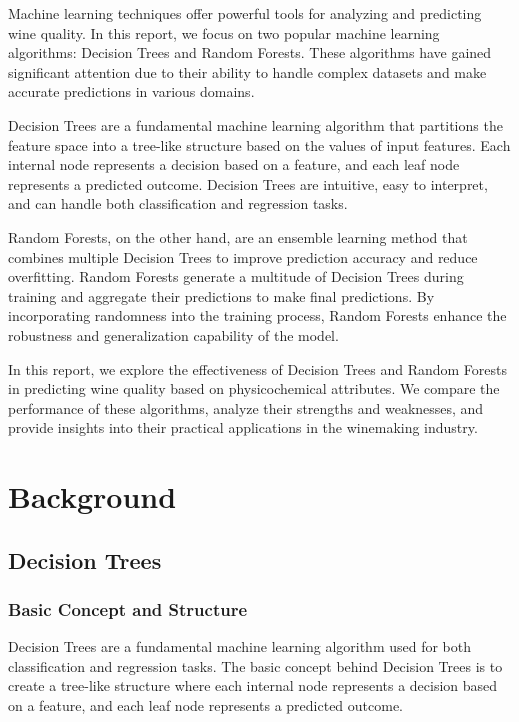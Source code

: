 \documentclass{ufazreport}
\begin{document}
Machine learning techniques offer powerful tools for analyzing and predicting wine quality. In this report, we focus on two popular machine learning algorithms: Decision Trees and Random Forests. These algorithms have gained significant attention due to their ability to handle complex datasets and make accurate predictions in various domains.

Decision Trees are a fundamental machine learning algorithm that partitions the feature space into a tree-like structure based on the values of input features. Each internal node represents a decision based on a feature, and each leaf node represents a predicted outcome. Decision Trees are intuitive, easy to interpret, and can handle both classification and regression tasks.

Random Forests, on the other hand, are an ensemble learning method that combines multiple Decision Trees to improve prediction accuracy and reduce overfitting. Random Forests generate a multitude of Decision Trees during training and aggregate their predictions to make final predictions. By incorporating randomness into the training process, Random Forests enhance the robustness and generalization capability of the model.

In this report, we explore the effectiveness of Decision Trees and Random Forests in predicting wine quality based on physicochemical attributes. We compare the performance of these algorithms, analyze their strengths and weaknesses, and provide insights into their practical applications in the winemaking industry.

\section{Background}

\subsection{Decision Trees}

\subsubsection{Basic Concept and Structure}

Decision Trees are a fundamental machine learning algorithm used for both classification and regression tasks. The basic concept behind Decision Trees is to create a tree-like structure where each internal node represents a decision based on a feature, and each leaf node represents a predicted outcome.
\end{document}
